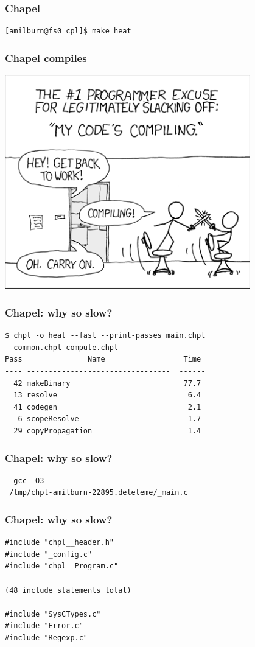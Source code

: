 \documentclass{beamer}
\begin{document}
\begin{frame}[fragile]
 \frametitle{Chapel}
\begin{verbatim}
[amilburn@fs0 cpl]$ make heat
\end{verbatim}
\end{frame}

\begin{frame}
 \frametitle{Chapel compiles}
 \includegraphics[width=0.8\textwidth]{xkcd.png}
\end{frame}

\begin{frame}[fragile]
 \frametitle{Chapel: why so slow?}
\begin{verbatim}
$ chpl -o heat --fast --print-passes main.chpl
  common.chpl compute.chpl
Pass               Name                  Time
---- ---------------------------------  ------
  42 makeBinary                          77.7
  13 resolve                              6.4
  41 codegen                              2.1
   6 scopeResolve                         1.7
  29 copyPropagation                      1.4
\end{verbatim}
\end{frame}

\begin{frame}[fragile]
 \frametitle{Chapel: why so slow?}
\begin{verbatim}
  gcc -O3
 /tmp/chpl-amilburn-22895.deleteme/_main.c
\end{verbatim}
\end{frame}

\begin{frame}[fragile]
 \frametitle{Chapel: why so slow?}
\begin{verbatim}
#include "chpl__header.h"
#include "_config.c"
#include "chpl__Program.c"

(48 include statements total)

#include "SysCTypes.c"
#include "Error.c"
#include "Regexp.c"
\end{verbatim}
\end{frame}
\end{document}
